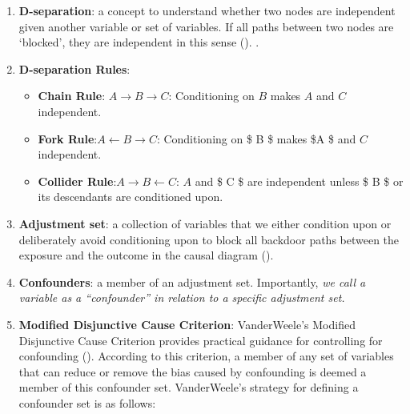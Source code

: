 \documentclass[
  singlecolumn,
  9pt]{article}
\providecommand{\tightlist}{%
  \setlength{\itemsep}{0pt}\setlength{\parskip}{0pt}}\usepackage{longtable,booktabs,array}
\begin{document}
\begin{enumerate}
\def\labelenumi{\arabic{enumi}.}
\setcounter{enumi}{3}
\item
  \textbf{D-separation}: a concept to understand whether two nodes are
  independent given another variable or set of variables. If all paths
  between two nodes are `blocked', they are independent in this sense
  (). .
\item
  \textbf{D-separation Rules}:

  \begin{itemize}
  \tightlist
  \item
    \textbf{Chain Rule}: \(A \rightarrow B \rightarrow C\): Conditioning
    on \(B\) makes \(A\) and \(C\) independent.
  \item
    \textbf{Fork Rule}:\(A \leftarrow B \rightarrow C\): Conditioning on
    \$ B \$ makes \$A \$ and \(C\)independent.
  \item
    \textbf{Collider Rule}:\(A \rightarrow B \leftarrow C\): \(A\) and
    \$ C \$ are independent unless \$ B \$ or its descendants are
    conditioned upon.
  \end{itemize}
\item
  \textbf{Adjustment set}: a collection of variables that we either
  condition upon or deliberately avoid conditioning upon to block all
  backdoor paths between the exposure and the outcome in the causal
  diagram ().
\item
  \textbf{Confounders}: a member of an adjustment set. Importantly,
  \emph{we call a variable as a ``confounder'' in relation to a specific
  adjustment set.}
\item
  \textbf{Modified Disjunctive Cause Criterion}: VanderWeele's Modified
  Disjunctive Cause Criterion provides practical guidance for
  controlling for confounding
  (). According to this
  criterion, a member of any set of variables that can reduce or remove
  the bias caused by confounding is deemed a member of this confounder
  set. VanderWeele's strategy for defining a confounder set is as
  follows:
\end{enumerate}
\end{document}
